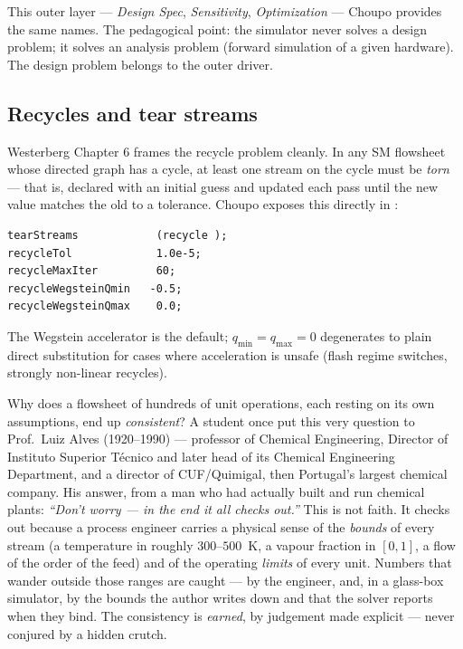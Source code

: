 \documentclass[11pt,a4paper]{article}
\begin{document}
\noindent This outer layer --- \emph{Design Spec},
\emph{Sensitivity}, \emph{Optimization} --- Choupo provides the same
names.  The pedagogical point: the simulator never solves a
design problem; it solves an analysis problem (forward
simulation of a given hardware).  The design problem belongs to
the outer driver.

\subsection{Recycles and tear streams}

Westerberg \cite{Westerberg1979} Chapter 6 frames the recycle
problem cleanly.  In any SM flowsheet whose directed graph has
a cycle, at least one stream on the cycle must be \emph{torn} ---
that is, declared with an initial guess and updated each pass
until the new value matches the old to a tolerance.  Choupo
exposes this directly in :

\begin{lstlisting}[language=dict]
tearStreams            (recycle );
recycleTol             1.0e-5;
recycleMaxIter         60;
recycleWegsteinQmin   -0.5;
recycleWegsteinQmax    0.0;
\end{lstlisting}

\noindent The Wegstein \cite{Wegstein} accelerator is the default;
$q_{\min} = q_{\max} = 0$ degenerates to plain direct substitution
for cases where acceleration is unsafe (flash regime switches,
strongly non-linear recycles).

\begin{intuition}
Why does a flowsheet of hundreds of unit operations, each resting on its
own assumptions, end up \emph{consistent}?  A student once put this very
question to Prof.\ Luiz Alves (1920--1990) --- professor of Chemical
Engineering, Director of Instituto Superior T\'ecnico and later head of its
Chemical Engineering Department, and a director of CUF/Quimigal, then
Portugal's largest chemical company.  His answer, from a man who had actually
built and run chemical plants: \emph{``Don't worry --- in the end it all
checks out.''}  This is not faith.  It checks
out because a process engineer carries a physical sense of the \emph{bounds}
of every stream (a temperature in roughly $300$--$500$~K, a vapour fraction
in $[0,1]$, a flow of the order of the feed) and of the operating
\emph{limits} of every unit.  Numbers that wander outside those ranges are
caught --- by the engineer, and, in a glass-box simulator, by the bounds the
author writes down and that the solver reports when they bind.  The
consistency is \emph{earned}, by judgement made explicit --- never conjured
by a hidden crutch.
\end{intuition}
\end{document}
